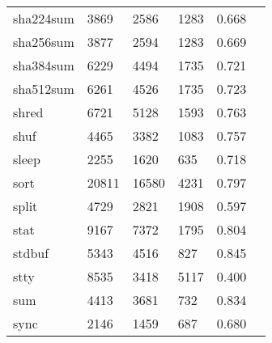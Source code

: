 \begin{longtable}{lp{2.4cm}p{2.4cm}p{2.4cm}p{2.4cm}p{2.4cm}}
sha224sum &                                    3869 &                        2586 &                         1283 &                                   0.668 \\
sha256sum &                                    3877 &                        2594 &                         1283 &                                   0.669 \\
sha384sum &                                    6229 &                        4494 &                         1735 &                                   0.721 \\
sha512sum &                                    6261 &                        4526 &                         1735 &                                   0.723 \\
shred     &                                    6721 &                        5128 &                         1593 &                                   0.763 \\
shuf      &                                    4465 &                        3382 &                         1083 &                                   0.757 \\
sleep     &                                    2255 &                        1620 &                          635 &                                   0.718 \\
sort      &                                   20811 &                       16580 &                         4231 &                                   0.797 \\
split     &                                    4729 &                        2821 &                         1908 &                                   0.597 \\
stat      &                                    9167 &                        7372 &                         1795 &                                   0.804 \\
stdbuf    &                                    5343 &                        4516 &                          827 &                                   0.845 \\
stty      &                                    8535 &                        3418 &                         5117 &                                   0.400 \\
sum       &                                    4413 &                        3681 &                          732 &                                   0.834 \\
sync      &                                    2146 &                        1459 &                          687 &                                   0.680 \\

\end{longtable}
